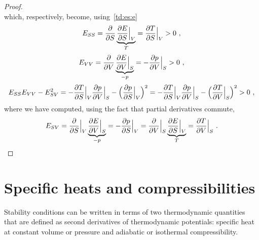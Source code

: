 \begin{proof}
\begin{equation*}
        \end{equation*}
        which, respectively, become, using~\eqref{td:es:e} 
        \begin{equation*}
            E_{SS} = \frac{\partial}{\partial S} \underbrace{\frac{\partial E}{\partial S} \Big \vert_V}_{T}  = \frac{\partial T}{\partial S} \Big \vert_V > 0 ~,
        \end{equation*}
        \begin{equation*}
            E_{VV} = \frac{\partial}{\partial V} \underbrace{\frac{\partial E}{\partial V} \Big \vert_S}_{-p} = - \frac{\partial p}{\partial V} \Big \vert_S > 0 ~,
        \end{equation*}
        \begin{equation*}
            E_{SS}E_{VV} - E^2_{SV} = - \frac{\partial T}{\partial S} \Big \vert_V \frac{\partial p}{\partial V} \Big \vert_S - \Big ( \frac{\partial p}{\partial S} \Big \vert_V \Big )^2 = - \frac{\partial T}{\partial S} \Big \vert_V \frac{\partial p}{\partial V} \Big \vert_S - \Big ( \frac{\partial T}{\partial V} \Big \vert_S \Big )^2 > 0 ~,
        \end{equation*}
        where we have computed, using the fact that partial derivatives commute,
        \begin{equation*}
            E_{SV} = \frac{\partial}{\partial S} \Big \vert_V \underbrace{\frac{\partial E}{\partial V} \Big \vert_S}_{-p} = - \frac{\partial p}{\partial S} \Big \vert_V = \frac{\partial}{\partial V} \Big \vert_S \underbrace{\frac{\partial E}{\partial S} \Big \vert_V}_{T} = \frac{\partial T}{\partial V} \Big \vert_S ~.
        \end{equation*}
    \end{proof}

\section{Specific heats and compressibilities}

    Stability conditions can be written in terms of two thermodynamic quantities that are defined as second derivatives of thermodynamic potentials: specific heat at constant volume or pressure and adiabatic or isothermal compressibility.

